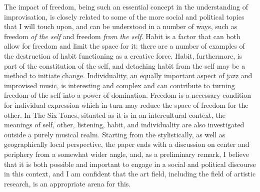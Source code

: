 \documentclass[a4paper]{article}
\begin{document}

The impact of freedom, being such an essential concept in the understanding of improvisation, is closely related to some of the more social and political topics that I will touch upon, and can be understood in a number of ways, such as freedom \emph{of the self} and freedom \emph{from the self}. Habit is a factor that can both allow for freedom and limit the space for it: there are a number of examples of the destruction of habit  functioning as a creative force. Habit, furthermore, is part of the constitution of the self, and detaching habit from the self may be a method to initiate change. Individuality, an equally important aspect of jazz and improvised music, is interesting and complex and can contribute to turning freedom-of-the-self into a power of domination. Freedom is a necessary condition for individual expression which in turn may reduce the space of freedom for the other. In The Six Tones, situated as it is in an intercultural context, the meanings of self, other, listening, habit, and individuality are also investigated outside a purely musical realm. Starting from the stylistically, as well as geographically local perspective, the paper ends with a discussion on center and periphery from a somewhat wider angle, and, as a preliminary remark, I believe that it is both possible and important to engage in a social and political discourse in this context, and I am confident that the art field, including the field of artistic research, is an appropriate arena for this.
\end{document}
